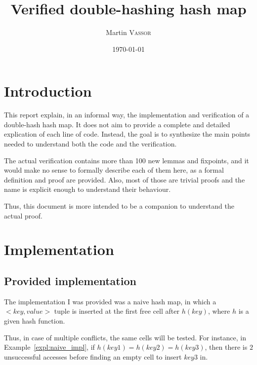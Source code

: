 \documentclass[oneside]{article}
\title{Verified double-hashing hash map}
\author{Martin \textsc{Vassor}}
\date{\today}
\begin{document}
\maketitle

\section{Introduction}
This report explain, in an informal way, the implementation and verification of a double-hash hash map. It does not aim to provide a complete and detailed explication of each line of code. Instead, the goal is to synthesize the main points needed to understand both the code and the verification.

The actual verification contains more than 100 new lemmas and fixpoints, and it would make no sense to formally describe each of them here, as a formal definition and proof are provided. Also, most of those are trivial proofs and the name is explicit enough to understand their behaviour.

Thus, this document is more intended to be a companion to understand the actual proof.


\section{Implementation}
\subsection{Provided implementation}
The implementation I was provided was a naive hash map, in which a $<key, value>$ tuple is inserted at the first free cell after $h(key)$, where $h$ is a given hash function.

Thus, in case of multiple conflicts, the same cells will be tested. For instance, in Example~\ref{expl:naive_impl}, if $h(key1) = h(key2) = h(key3)$, then there is $2$ unsuccessful accesses before finding an empty cell to insert $key3$ in.
\end{document}
